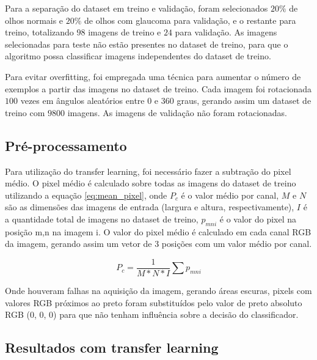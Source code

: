 \documentclass[conference]{IEEEtran}
\begin{document}
  Para a separação do dataset em treino e validação, foram selecionados $20\%$ de olhos normais e $20\%$ de olhos com glaucoma para validação, e o restante para treino, totalizando $98$ imagens de treino e $24$ para validação. As imagens selecionadas para teste não estão presentes no dataset de treino, para que o algoritmo possa classificar imagens independentes do dataset de treino.

  Para evitar overfitting, foi empregada uma técnica para aumentar o número de exemplos a partir das imagens no dataset de treino. Cada imagem foi rotacionada $100$ vezes em ângulos aleatórios entre $0$ e $360$ graus, gerando assim um dataset de treino com $9800$ imagens. As imagens de validação não foram rotacionadas.

  \subsection{Pré-processamento}


  
  
  Para utilização do transfer learning, foi necessário fazer a subtração do pixel médio. O pixel médio é calculado sobre todas as imagens do dataset de treino utilizando a equação \ref{eq:mean_pixel}, onde $P_c$ é o valor médio por canal, $M$ e $N$ são as dimensões das imagens de entrada (largura e altura, respectivamente), $I$ é a quantidade total de imagens no dataset de treino, $p_{mni}$ é o valor do pixel na posição m,n na imagem i. O valor do pixel médio é calculado em cada canal RGB da imagem, gerando assim um vetor de 3 posições com um valor médio por canal.

  \begin{equation}
    P_c = \frac{1}{M * N * I} \sum p_{mni}
    \label{eq:mean_pixel}
  \end{equation}

  Onde houveram falhas na aquisição da imagem, gerando áreas escuras, pixels com valores RGB próximos ao preto foram substituídos pelo valor de preto absoluto RGB (0, 0, 0) para que não tenham influência sobre a decisão do classificador.

  \subsection{Resultados com transfer learning}
\end{document}
